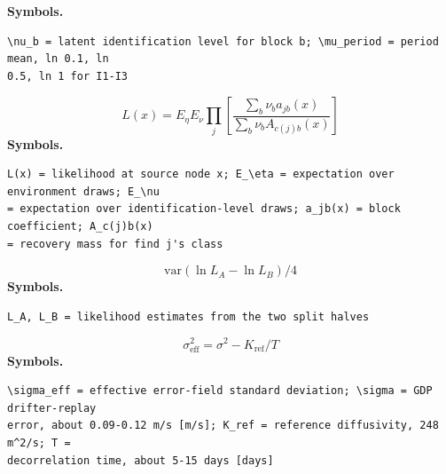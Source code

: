 \documentclass[11pt,a4paper]{article}
\begin{document}
\noindent\textbf{Symbols.}
\begin{verbatim}
\nu_b = latent identification level for block b; \mu_period = period mean, ln 0.1, ln
0.5, ln 1 for I1-I3
\end{verbatim}
\medskip
\begin{equation}
L(x) = E_\eta E_\nu \prod_j \left[ \frac{\sum_b \nu_b a_{jb}(x)}{\sum_b \nu_b A_{c(j)b}(x)} \right]
\end{equation}
\noindent\textbf{Symbols.}
\begin{verbatim}
L(x) = likelihood at source node x; E_\eta = expectation over environment draws; E_\nu
= expectation over identification-level draws; a_jb(x) = block coefficient; A_c(j)b(x)
= recovery mass for find j's class
\end{verbatim}
\medskip
\begin{equation}
\mathrm{var}(\ln L_A - \ln L_B)/4
\end{equation}
\noindent\textbf{Symbols.}
\begin{verbatim}
L_A, L_B = likelihood estimates from the two split halves
\end{verbatim}
\medskip
\begin{equation}
\sigma_{\mathrm{eff}}^2 = \sigma^2 - K_{\mathrm{ref}}/T
\end{equation}
\noindent\textbf{Symbols.}
\begin{verbatim}
\sigma_eff = effective error-field standard deviation; \sigma = GDP drifter-replay
error, about 0.09-0.12 m/s [m/s]; K_ref = reference diffusivity, 248 m^2/s; T =
decorrelation time, about 5-15 days [days]
\end{verbatim}
\medskip
\end{document}

